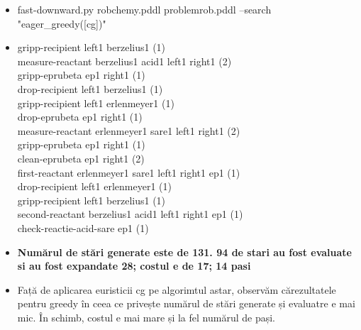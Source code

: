    \begin{itemize}
    \setlength\itemsep{0em}
    \item   fast-downward.py robchemy.pddl problemrob.pddl --search "eager\_greedy([cg])"
    \item 
gripp-recipient left1 berzelius1 (1)\\
measure-reactant berzelius1 acid1 left1 right1 (2)\\
gripp-eprubeta ep1 right1 (1)\\
drop-recipient left1 berzelius1 (1)\\
gripp-recipient left1 erlenmeyer1 (1)\\
drop-eprubeta ep1 right1 (1)\\
measure-reactant erlenmeyer1 sare1 left1 right1 (2)\\
gripp-eprubeta ep1 right1 (1)\\
clean-eprubeta ep1 right1 (2)\\
first-reactant erlenmeyer1 sare1 left1 right1 ep1 (1)\\
drop-recipient left1 erlenmeyer1 (1)\\
gripp-recipient left1 berzelius1 (1)\\
second-reactant berzelius1 acid1 left1 right1 ep1 (1)\\
check-reactie-acid-sare ep1 (1)
    \item \textbf{Numărul de stări generate este de 131. 94 de stari au fost evaluate si au fost expandate 28; costul e de 17; 14 pasi}
    \item Față de aplicarea euristicii cg pe algorimtul astar, observăm cărezultatele pentru greedy în ceea ce privește numărul de stări generate și evaluatre e mai mic. În schimb, costul e mai mare și la fel numărul de pași.  
\end{itemize}
\vspace{1.75cm}


